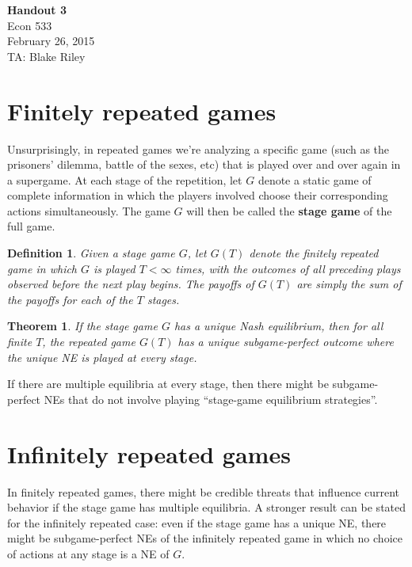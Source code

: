 \documentclass[letter, 10pt]{article}
\theoremstyle{basic}
\newtheorem{definition}{Definition}[section]
\newtheorem{theorem}{Theorem}[section]
\begin{document}
\begin{spacing}{1.0}

\noindent
\textbf{Handout 3} \\
Econ 533 \\
February 26, 2015 \\
TA: Blake Riley \\

\section{Finitely repeated games}

Unsurprisingly, in repeated games we're analyzing a
specific game (such as the prisoners' dilemma, battle of
the sexes, etc) that is played over and over again in a
supergame. At each stage of the repetition, let $G$
denote a static game of complete information in which the
players involved choose their corresponding actions
simultaneously. The game $G$ will then be called the
\textbf{stage game} of the full game.

\begin{definition}
  Given a stage game $G$, let $G(T)$ denote the finitely
  repeated game in which $G$ is played $T<\infty$ times,
  with the outcomes of all preceding plays observed
  before the next play begins. The payoffs of $G(T)$ are
  simply the sum of the payoffs for each of the $T$ stages.
\end{definition}

\begin{theorem}
  If the stage game $G$ has a unique Nash equilibrium,
  then for all finite $T$, the repeated game $G(T)$ has a
  unique subgame-perfect outcome where the unique NE is
  played at every stage.
\end{theorem}

If there are multiple equilibria at every
stage, then there might be subgame-perfect NEs that do
not involve playing ``stage-game equilibrium
strategies''.

\section{Infinitely repeated games}

In finitely repeated games, there might be credible threats that influence
current behavior if the stage game has multiple equilibria. A stronger
result can be stated for the infinitely repeated case: even if the stage
game has a unique NE, there might be subgame-perfect NEs of the infinitely
repeated game in which no choice of actions at any stage is a NE of $G$.


\end{spacing}
\end{document}
